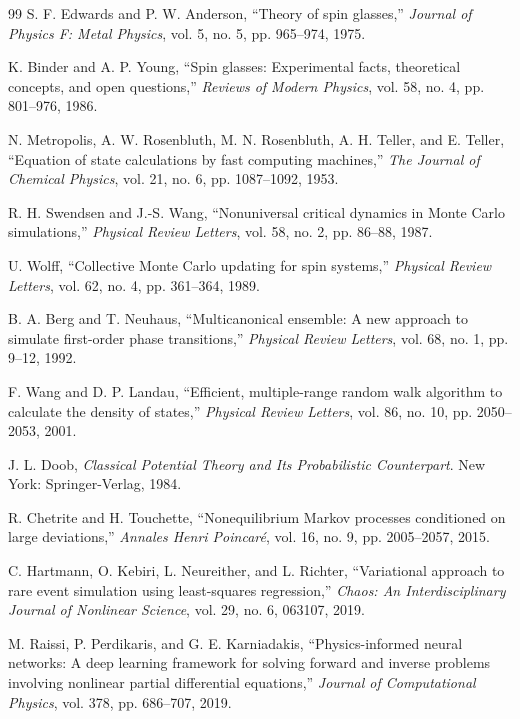 \documentclass[11pt]{article}
\begin{document}
\begin{thebibliography}{99}
		S. F. Edwards and P. W. Anderson, ``Theory of spin glasses,'' \emph{Journal of Physics F: Metal Physics}, vol. 5, no. 5, pp. 965--974, 1975.
		
		K. Binder and A. P. Young, ``Spin glasses: Experimental facts, theoretical concepts, and open questions,'' \emph{Reviews of Modern Physics}, vol. 58, no. 4, pp. 801--976, 1986.
		
		N. Metropolis, A. W. Rosenbluth, M. N. Rosenbluth, A. H. Teller, and E. Teller, ``Equation of state calculations by fast computing machines,'' \emph{The Journal of Chemical Physics}, vol. 21, no. 6, pp. 1087--1092, 1953.
		
		R. H. Swendsen and J.-S. Wang, ``Nonuniversal critical dynamics in Monte Carlo simulations,'' \emph{Physical Review Letters}, vol. 58, no. 2, pp. 86--88, 1987.
		
		U. Wolff, ``Collective Monte Carlo updating for spin systems,'' \emph{Physical Review Letters}, vol. 62, no. 4, pp. 361--364, 1989.
		
		B. A. Berg and T. Neuhaus, ``Multicanonical ensemble: A new approach to simulate first-order phase transitions,'' \emph{Physical Review Letters}, vol. 68, no. 1, pp. 9--12, 1992.
		
		F. Wang and D. P. Landau, ``Efficient, multiple-range random walk algorithm to calculate the density of states,'' \emph{Physical Review Letters}, vol. 86, no. 10, pp. 2050--2053, 2001.
		
		J. L. Doob, \emph{Classical Potential Theory and Its Probabilistic Counterpart}. New York: Springer-Verlag, 1984.
		
		R. Chetrite and H. Touchette, ``Nonequilibrium Markov processes conditioned on large deviations,'' \emph{Annales Henri Poincar\'{e}}, vol. 16, no. 9, pp. 2005--2057, 2015.
		
		C. Hartmann, O. Kebiri, L. Neureither, and L. Richter, ``Variational approach to rare event simulation using least-squares regression,'' \emph{Chaos: An Interdisciplinary Journal of Nonlinear Science}, vol. 29, no. 6, 063107, 2019.
		
		M. Raissi, P. Perdikaris, and G. E. Karniadakis, ``Physics-informed neural networks: A deep learning framework for solving forward and inverse problems involving nonlinear partial differential equations,'' \emph{Journal of Computational Physics}, vol. 378, pp. 686--707, 2019.
		

\end{thebibliography}
\end{document}
